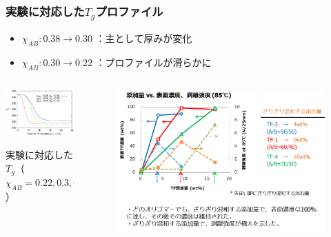 \documentclass[unicode,12pt]{beamer}%
\begin{document}
\begin{frame}\frametitle{実験に対応した$T_g$プロファイル}

\begin{itemize}
	\item $\chi_{AB}: 0.38 \rightarrow 0.30$ ：主として厚みが変化
	\item $\chi_{AB}: 0.30 \rightarrow 0.22$ ：プロファイルが滑らかに
\end{itemize}

\vspace{-3mm}

\begin{columns}
	\begin{column}{.48\textwidth}
		\centering
				\includegraphics[width=60mm]{Tg.eps}

			\vspace{-3mm}
			{\footnotesize 実験に対応した$T_g$（$\chi_{AB} = 0.22, 0.3, 0.38$）}
	\end{column}
	\begin{column}{.48\textwidth}

		\begin{figure}[htbp]
			\begin{center}
				\includegraphics[width=.85\textwidth]{tennkaryou_3.png}
			\end{center}
		\end{figure}
		

\end{column}
\end{columns}
\end{frame}
\end{document}
